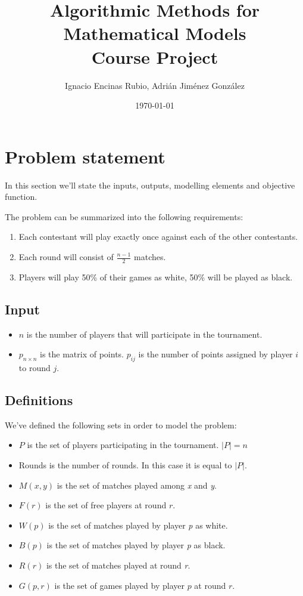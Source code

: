 \documentclass[a4paper, 10pt]{article}
\title{Algorithmic Methods for Mathematical Models\\Course Project}
\author{Ignacio Encinas Rubio, Adrián Jiménez González}
\date{\normalsize\today{}}
\begin{document}
\maketitle

\tableofcontents

\clearpage

\section{Problem statement}
In this section we'll state the inputs, outputs, modelling elements and objective function.

The problem can be summarized into the following requirements:

\begin{enumerate}
    \item Each contestant will play exactly once against each of the other contestants.
    \item Each round will consist of $\frac{n-1}{2}$ matches.
    \item Players will play 50\% of their games as white, 50\% will be played as black.
\end{enumerate}


\subsection{Input}
\begin{itemize}
    \item $n$ is the number of players that will participate in the tournament.
    \item $p_{n \times n}$ is the matrix of points. $p_{ij}$ is the number of points assigned by player $i$ to round $j$.
\end{itemize}

\subsection{Definitions}
We've defined the following sets in order to model the problem:

\begin{itemize}
    \item $P$ is the set of players participating in the tournament. $|P| = n$
    \item Rounds is the number of rounds. In this case it is equal to $|P|$.
    \item $M(x, y)$  is the set of matches played among \textit{x} and \textit{y}.
    \item $F(r)$ is the set of free players at round $r$.
    \item $W(p)$ is the set of matches played by player \textit{p} as white.
    \item $B(p)$ is the set of matches played by player \textit{p} as black.
    \item $R(r)$  is the set of matches played at round \textit{r}.
    \item $G(p,r)$ is the set of games played by player $p$ at round $r$.
\end{itemize}
\end{document}

